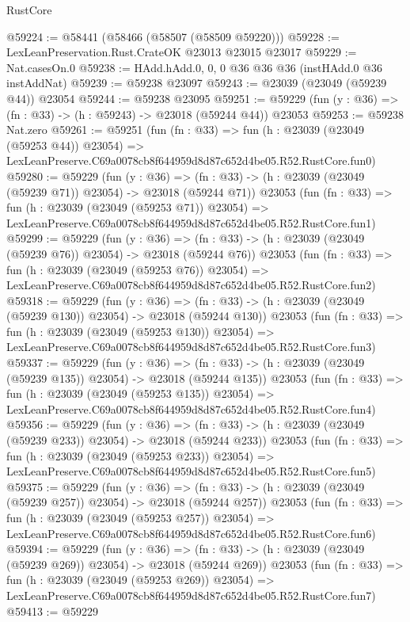 \begin{lexlean}{RustCore}
\begin{coremodule}
@59224 := @58441 (@58466 (@58507 (@58509 @59220)))
@59228 := LexLeanPreservation.Rust.CrateOK @23013 @23015 @23017
@59229 := Nat.casesOn.{0}
@59238 := HAdd.hAdd.{0, 0, 0} @36 @36 @36 (instHAdd.{0} @36 instAddNat)
@59239 := @59238 @23097
@59243 := @23039 (@23049 (@59239 @44)) @23054
@59244 := @59238 @23095
@59251 := @59229 (fun (y : @36) => (fn : @33) -> (h : @59243) -> @23018 (@59244 @44)) @23053
@59253 := @59238 Nat.zero
@59261 := @59251
    (fun (fn : @33) =>
    fun (h : @23039 (@23049 (@59253 @44)) @23054) =>
    LexLeanPreserve.C69a0078cb8f644959d8d87c652d4be05.R52.RustCore.fun0)
@59280 := @59229
    (fun (y : @36) =>
    (fn : @33) -> (h : @23039 (@23049 (@59239 @71)) @23054) -> @23018 (@59244 @71))
    @23053
    (fun (fn : @33) =>
    fun (h : @23039 (@23049 (@59253 @71)) @23054) =>
    LexLeanPreserve.C69a0078cb8f644959d8d87c652d4be05.R52.RustCore.fun1)
@59299 := @59229
    (fun (y : @36) =>
    (fn : @33) -> (h : @23039 (@23049 (@59239 @76)) @23054) -> @23018 (@59244 @76))
    @23053
    (fun (fn : @33) =>
    fun (h : @23039 (@23049 (@59253 @76)) @23054) =>
    LexLeanPreserve.C69a0078cb8f644959d8d87c652d4be05.R52.RustCore.fun2)
@59318 := @59229
    (fun (y : @36) =>
    (fn : @33) -> (h : @23039 (@23049 (@59239 @130)) @23054) -> @23018 (@59244 @130))
    @23053
    (fun (fn : @33) =>
    fun (h : @23039 (@23049 (@59253 @130)) @23054) =>
    LexLeanPreserve.C69a0078cb8f644959d8d87c652d4be05.R52.RustCore.fun3)
@59337 := @59229
    (fun (y : @36) =>
    (fn : @33) -> (h : @23039 (@23049 (@59239 @135)) @23054) -> @23018 (@59244 @135))
    @23053
    (fun (fn : @33) =>
    fun (h : @23039 (@23049 (@59253 @135)) @23054) =>
    LexLeanPreserve.C69a0078cb8f644959d8d87c652d4be05.R52.RustCore.fun4)
@59356 := @59229
    (fun (y : @36) =>
    (fn : @33) -> (h : @23039 (@23049 (@59239 @233)) @23054) -> @23018 (@59244 @233))
    @23053
    (fun (fn : @33) =>
    fun (h : @23039 (@23049 (@59253 @233)) @23054) =>
    LexLeanPreserve.C69a0078cb8f644959d8d87c652d4be05.R52.RustCore.fun5)
@59375 := @59229
    (fun (y : @36) =>
    (fn : @33) -> (h : @23039 (@23049 (@59239 @257)) @23054) -> @23018 (@59244 @257))
    @23053
    (fun (fn : @33) =>
    fun (h : @23039 (@23049 (@59253 @257)) @23054) =>
    LexLeanPreserve.C69a0078cb8f644959d8d87c652d4be05.R52.RustCore.fun6)
@59394 := @59229
    (fun (y : @36) =>
    (fn : @33) -> (h : @23039 (@23049 (@59239 @269)) @23054) -> @23018 (@59244 @269))
    @23053
    (fun (fn : @33) =>
    fun (h : @23039 (@23049 (@59253 @269)) @23054) =>
    LexLeanPreserve.C69a0078cb8f644959d8d87c652d4be05.R52.RustCore.fun7)
@59413 := @59229

\end{coremodule}
\end{lexlean}
